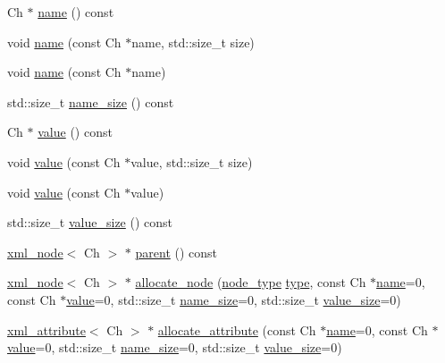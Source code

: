 \begin{DoxyCompactItemize}
Ch $\ast$ \hyperlink{classrapidxml_1_1xml__base_a9a09739310469995db078ebd0da3ed45}{name} () const 
\item 
void \hyperlink{classrapidxml_1_1xml__base_ae55060ae958c6e6465d6c8db852ec6ce}{name} (const Ch $\ast$name, std\+::size\+\_\+t size)
\item 
void \hyperlink{classrapidxml_1_1xml__base_a4611ddc82ac83a527c65606600eb2a0d}{name} (const Ch $\ast$name)
\item 
std\+::size\+\_\+t \hyperlink{classrapidxml_1_1xml__base_a7e7f98b3d01e1eab8dc1ca69aad9af84}{name\+\_\+size} () const 
\item 
Ch $\ast$ \hyperlink{classrapidxml_1_1xml__base_adcdaccff61c665f039d9344e447b7445}{value} () const 
\item 
void \hyperlink{classrapidxml_1_1xml__base_a3b183c2db7022a6d30494dd2f0ac11e9}{value} (const Ch $\ast$value, std\+::size\+\_\+t size)
\item 
void \hyperlink{classrapidxml_1_1xml__base_a81e63ec4bfd2d7ef0a6c2ed49be6e623}{value} (const Ch $\ast$value)
\item 
std\+::size\+\_\+t \hyperlink{classrapidxml_1_1xml__base_a9fcf201ed0915ac18dd43b0b5dcfaf32}{value\+\_\+size} () const 
\item 
\hyperlink{classrapidxml_1_1xml__node}{xml\+\_\+node}$<$ Ch $>$ $\ast$ \hyperlink{classrapidxml_1_1xml__base_a7f31ae930f93852830234db1ae59c4c4}{parent} () const 
\item 
\hyperlink{classrapidxml_1_1xml__node}{xml\+\_\+node}$<$ Ch $>$ $\ast$ \hyperlink{classrapidxml_1_1memory__pool_a4118581c29ee9a2f6b55ebf7dac185f8}{allocate\+\_\+node} (\hyperlink{namespacerapidxml_abb456db38f7efb746c4330eed6072a7c}{node\+\_\+type} \hyperlink{classrapidxml_1_1xml__node_a2c6a4315b98bcfa2e04fed3fa1b22c36}{type}, const Ch $\ast$\hyperlink{classrapidxml_1_1xml__base_a9a09739310469995db078ebd0da3ed45}{name}=0, const Ch $\ast$\hyperlink{classrapidxml_1_1xml__base_adcdaccff61c665f039d9344e447b7445}{value}=0, std\+::size\+\_\+t \hyperlink{classrapidxml_1_1xml__base_a7e7f98b3d01e1eab8dc1ca69aad9af84}{name\+\_\+size}=0, std\+::size\+\_\+t \hyperlink{classrapidxml_1_1xml__base_a9fcf201ed0915ac18dd43b0b5dcfaf32}{value\+\_\+size}=0)
\item 
\hyperlink{classrapidxml_1_1xml__attribute}{xml\+\_\+attribute}$<$ Ch $>$ $\ast$ \hyperlink{classrapidxml_1_1memory__pool_a3de2a66c983336e006ea3844e244ed30}{allocate\+\_\+attribute} (const Ch $\ast$\hyperlink{classrapidxml_1_1xml__base_a9a09739310469995db078ebd0da3ed45}{name}=0, const Ch $\ast$\hyperlink{classrapidxml_1_1xml__base_adcdaccff61c665f039d9344e447b7445}{value}=0, std\+::size\+\_\+t \hyperlink{classrapidxml_1_1xml__base_a7e7f98b3d01e1eab8dc1ca69aad9af84}{name\+\_\+size}=0, std\+::size\+\_\+t \hyperlink{classrapidxml_1_1xml__base_a9fcf201ed0915ac18dd43b0b5dcfaf32}{value\+\_\+size}=0)

\end{DoxyCompactItemize}
